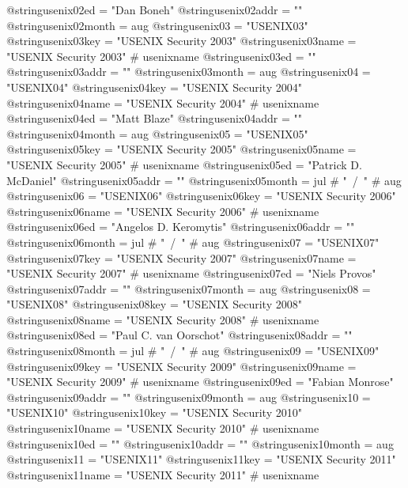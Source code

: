 @string{usenix02ed =            "Dan Boneh"}
@string{usenix02addr =          ""}
@string{usenix02month =         aug}
@string{usenix03 =              "USENIX03"}
@string{usenix03key =           "USENIX Security 2003"}
@string{usenix03name =          "USENIX Security 2003" # usenixname}
@string{usenix03ed =            ""}
@string{usenix03addr =          ""}
@string{usenix03month =         aug}
@string{usenix04 =              "USENIX04"}
@string{usenix04key =           "USENIX Security 2004"}
@string{usenix04name =          "USENIX Security 2004" # usenixname}
@string{usenix04ed =            "Matt Blaze"}
@string{usenix04addr =          ""}
@string{usenix04month =         aug}
@string{usenix05 =              "USENIX05"}
@string{usenix05key =           "USENIX Security 2005"}
@string{usenix05name =          "USENIX Security 2005" # usenixname}
@string{usenix05ed =            "Patrick D. McDaniel"}
@string{usenix05addr =          ""}
@string{usenix05month =         jul # "~/~" # aug}
@string{usenix06 =              "USENIX06"}
@string{usenix06key =           "USENIX Security 2006"}
@string{usenix06name =          "USENIX Security 2006" # usenixname}
@string{usenix06ed =            "Angelos D. Keromytis"}
@string{usenix06addr =          ""}
@string{usenix06month =         jul # "~/~" # aug}
@string{usenix07 =              "USENIX07"}
@string{usenix07key =           "USENIX Security 2007"}
@string{usenix07name =          "USENIX Security 2007" # usenixname}
@string{usenix07ed =            "Niels Provos"}
@string{usenix07addr =          ""}
@string{usenix07month =         aug}
@string{usenix08 =              "USENIX08"}
@string{usenix08key =           "USENIX Security 2008"}
@string{usenix08name =          "USENIX Security 2008" # usenixname}
@string{usenix08ed =            "Paul C. {van Oorschot}"}
@string{usenix08addr =          ""}
@string{usenix08month =         jul # "~/~" # aug}
@string{usenix09 =              "USENIX09"}
@string{usenix09key =           "USENIX Security 2009"}
@string{usenix09name =          "USENIX Security 2009" # usenixname}
@string{usenix09ed =            "Fabian Monrose"}
@string{usenix09addr =          ""}
@string{usenix09month =         aug}
@string{usenix10 =              "USENIX10"}
@string{usenix10key =           "USENIX Security 2010"}
@string{usenix10name =          "USENIX Security 2010" # usenixname}
@string{usenix10ed =            ""}
@string{usenix10addr =          ""}
@string{usenix10month =         aug}
@string{usenix11 =              "USENIX11"}
@string{usenix11key =           "USENIX Security 2011"}
@string{usenix11name =          "USENIX Security 2011" # usenixname}
